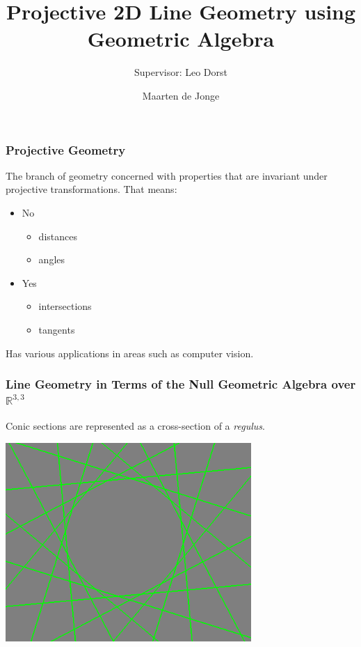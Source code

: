 \documentclass{beamer}
\author{Maarten de Jonge}
\title[PGA]{Projective 2D Line Geometry using Geometric Algebra}
\subtitle{Supervisor: Leo Dorst}
\newcommand{\rp}{$\mathbb{R}^{3,3}$}
\begin{document}
  \frame{\titlepage}
  
  \begin{frame}
    \frametitle{Projective Geometry}
    The branch of geometry concerned with properties that are
    invariant under projective transformations. That means:

    \begin{itemize}
      \item No
        \begin{itemize}
          \item distances
          \item angles
        \end{itemize}
      \item Yes 
        
        \begin{itemize}
          \item intersections
          \item tangents
        \end{itemize}
    \end{itemize}
    
    Has various applications in areas such as computer vision.
  \end{frame}

  \begin{frame}
    \frametitle{Line Geometry in Terms of the Null
Geometric Algebra over \rp\cite{hangbo2011}}
    Conic sections are represented as a cross-section of a \emph{regulus}.
    \begin{center}
      \includegraphics[width=0.7\textwidth]{circle.png}
    \end{center}
  \end{frame}
\end{document}
